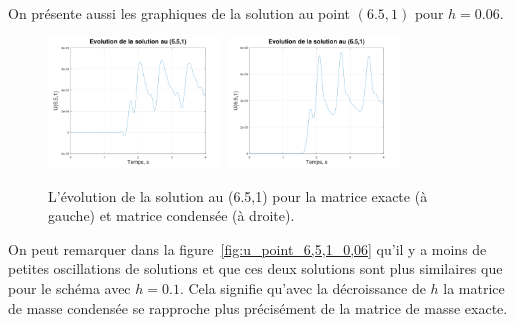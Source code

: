 \documentclass[12pt]{article}
\begin{document}
\noindent On présente aussi les graphiques de la solution au point $(6.5,1)$ pour $h=0.06$. 
\begin{figure}[H]
	\hspace{1cm}\includegraphics[width=0.41\textwidth]{images/u_6,5,1_0,06}\hspace{1cm}
	\includegraphics[width=0.41\textwidth]{images/u_6,5,1_0,06_condense}\hspace{1cm}
	\caption{L'évolution de la solution au (6.5,1) pour la matrice exacte (à gauche) et matrice condensée (à droite).}
	\label{fig:u_point_6,5,1_0,06}
\end{figure}
On peut remarquer dans la figure~\eqref{fig:u_point_6,5,1_0,06} qu'il y a moins de petites oscillations de solutions et que ces deux solutions sont plus similaires que pour le schéma avec $h=0.1$. Cela signifie qu'avec la décroissance de $h$ la matrice de masse condensée se rapproche plus précisément de la matrice de masse exacte.
\end{document}
